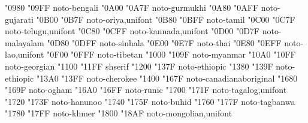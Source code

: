 \documentclass{article}
\begin{document}
                                            {  "0980} {  "09FF} {noto-bengali}
                                           {  "0A00} {  "0A7F} {noto-gurmukhi}
                                           {  "0A80} {  "0AFF} {noto-gujarati}
                                              {  "0B00} {  "0B7F} {noto-oriya,unifont}
                                              {  "0B80} {  "0BFF} {noto-tamil}
                                             {  "0C00} {  "0C7F} {noto-telugu,unifont}
                                            {  "0C80} {  "0CFF} {noto-kannada,unifont}
                                          {  "0D00} {  "0D7F} {noto-malayalam}
                                            {  "0D80} {  "0DFF} {noto-sinhala}
                                               {  "0E00} {  "0E7F} {noto-thai}
                                                {  "0E80} {  "0EFF} {noto-lao,unifont}
                                            {  "0F00} {  "0FFF} {noto-tibetan}
                                            {  "1000} {  "109F} {noto-myanmar}
                                           {  "10A0} {  "10FF} {noto-georgian}
                                        {  "1100} {  "11FF} {shserif}
                                           {  "1200} {  "137F} {noto-ethiopic}
                                {  "1380} {  "139F} {noto-ethiopic}
                                           {  "13A0} {  "13FF} {noto-cherokee}
              {  "1400} {  "167F} {noto-canadianaboriginal}
                                              {  "1680} {  "169F} {noto-ogham}
                                              {  "16A0} {  "16FF} {noto-runic}
                                            {  "1700} {  "171F} {noto-tagalog,unifont}
                                            {  "1720} {  "173F} {noto-hanunoo}
                                              {  "1740} {  "175F} {noto-buhid}
                                           {  "1760} {  "177F} {noto-tagbanwa}
                                              {  "1780} {  "17FF} {noto-khmer}
                                          {  "1800} {  "18AF} {noto-mongolian,unifont}
\end{document}
